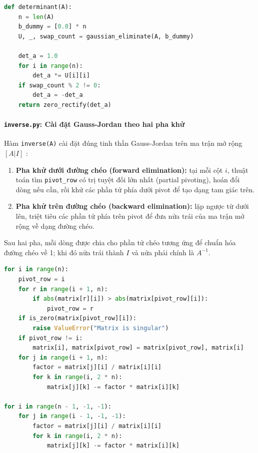 \begin{lstlisting}[language=Python, caption={Trích đoạn lõi trong \texttt{determinant.py}}]
def determinant(A):
    n = len(A)
    b_dummy = [0.0] * n
    U, _, swap_count = gaussian_eliminate(A, b_dummy)

    det_a = 1.0
    for i in range(n):
        det_a *= U[i][i]
    if swap_count % 2 != 0:
        det_a = -det_a
    return zero_rectify(det_a)
\end{lstlisting}

\paragraph{\texttt{inverse.py}: Cài đặt Gauss-Jordan theo hai pha khử}
Hàm \texttt{inverse(A)} cài đặt đúng tinh thần Gauss-Jordan trên ma trận mở rộng $[A|I]$ \cite{strang,golub}:
\begin{enumerate}
    \item \textbf{Pha khử dưới đường chéo (forward elimination):} tại mỗi cột $i$, thuật toán tìm \texttt{pivot\_row} có trị tuyệt đối lớn nhất (partial pivoting), hoán đổi dòng nếu cần, rồi khử các phần tử phía dưới pivot để tạo dạng tam giác trên.
    \item \textbf{Pha khử trên đường chéo (backward elimination):} lặp ngược từ dưới lên, triệt tiêu các phần tử phía trên pivot để đưa nửa trái của ma trận mở rộng về dạng đường chéo.
\end{enumerate}
Sau hai pha, mỗi dòng được chia cho phần tử chéo tương ứng để chuẩn hóa đường chéo về 1; khi đó nửa trái thành $I$ và nửa phải chính là $A^{-1}$.

\begin{lstlisting}[language=Python, caption={Hai pha khử trong \texttt{inverse.py}}]
for i in range(n):
    pivot_row = i
    for r in range(i + 1, n):
        if abs(matrix[r][i]) > abs(matrix[pivot_row][i]):
            pivot_row = r
    if is_zero(matrix[pivot_row][i]):
        raise ValueError("Matrix is singular")
    if pivot_row != i:
        matrix[i], matrix[pivot_row] = matrix[pivot_row], matrix[i]
    for j in range(i + 1, n):
        factor = matrix[j][i] / matrix[i][i]
        for k in range(i, 2 * n):
            matrix[j][k] -= factor * matrix[i][k]

for i in range(n - 1, -1, -1):
    for j in range(i - 1, -1, -1):
        factor = matrix[j][i] / matrix[i][i]
        for k in range(i, 2 * n):
            matrix[j][k] -= factor * matrix[i][k]
\end{lstlisting}

